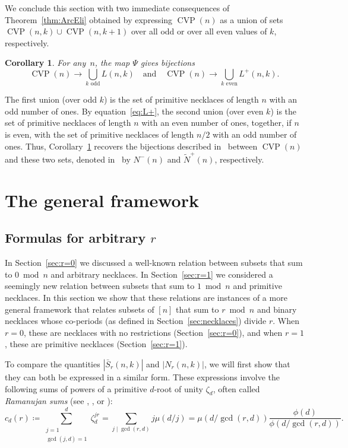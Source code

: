 \documentclass[12pt]{article}
\DeclareMathOperator{\CVP}{CVP}
\newcommand{\card}[1]{\left|#1\right|}
\newcommand{\droot}{\zeta_d}
\newcommand{\bS}{\bar{S}}
\newtheorem{corollary}[theorem]{Corollary}
\theoremstyle{definition}
\begin{document}
We conclude this section with two immediate consequences of Theorem~\ref{thm:ArcEli} obtained by expressing $\CVP(n)$ as a union of sets $\CVP(n,k)\cup\CVP(n,k+1)$ over all odd or over all even values of $k$, respectively.

\begin{corollary}\label{cor:CVPbijections}
For any~$n$, the map $\Psi$ gives bijections
$$\CVP(n)\to \bigcup_{k \text{ odd}}  L(n,k) \quad\text{and}\quad \CVP(n)\to\bigcup_{k \text{ even}} L^+(n,k).$$
\end{corollary}

The first union (over odd $k$) is the set of primitive necklaces of length $n$ with an odd number of ones.
By equation~\eqref{eq:L+}, the second union (over even $k$) is the set of primitive necklaces of length $n$ with an even number of ones, together, if $n$ is even, with the set of primitive necklaces of length $n/2$ with an odd number of ones.
Thus, Corollary~\ref{cor:CVPbijections} recovers the bijections described in~\cite{Baker} between $\CVP(n)$ and these two sets, denoted in~\cite{Baker} by $N^-(n)$ and $\tilde{N}^+(n)$, respectively.

\section{The general framework} \label{sec:general}

\subsection{Formulas for arbitrary $r$}

In Section~\ref{sec:r=0} we discussed a well-known relation between subsets that sum to $0\bmod n$ and arbitrary necklaces. In Section~\ref{sec:r=1} we considered a seemingly new relation between subsets that sum to $1\bmod n$ and primitive necklaces. 
In this section we show that these relations are instances of a more general framework that relates subsets of $[n]$ that sum to $r \bmod n$ and binary necklaces whose co-periods (as defined in Section~\ref{sec:necklaces}) divide $r$. 
When $r = 0$, these are necklaces with no restrictions (Section~\ref{sec:r=0}), and when $r = 1$, these are primitive necklaces (Section~\ref{sec:r=1}).

To compare the quantities $\card{\bS_r(n, k)}$ and $\card{N_r(n, k)}$, we will first show that they can both be expressed in a similar form. These expressions involve the following sums of powers of a primitive $d$-root of unity $\droot$, often called {\em Ramanujan sums} (see \cite[Ch.~8.3]{apostol}, \cite{apostol-paper}, or \cite[A086831]{oeis}):
\begin{equation}\label{eq:Ramanujan}
        c_d(r) \coloneqq \sum_{\substack{j = 1 \\ \gcd(j, d) = 1}}^d \droot^{j r} = \sum_{j \mid \gcd(r, d)} j \mu(d / j) 
               = \mu(d / \gcd(r, d))  \frac{\phi(d)}{\phi(d / \gcd(r, d))}.
\end{equation}
\end{document}
